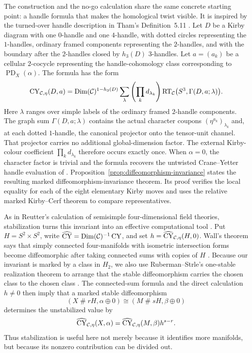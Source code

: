 The construction and the no-go calculation share the same concrete starting
point: a handle formula that makes the homological twist visible.  It is
inspired by the turned-over handle description in Tham's Definition~5.11
\cite{Tham2021}.  Let $D$ be a Kirby diagram with one $0$-handle and one
$4$-handle, with dotted circles representing the $1$-handles, ordinary
framed components representing the $2$-handles, and with the boundary after
the $2$-handles closed by $h_3(D)$ $3$-handles.  Let $a=(a_k)$ be a cellular
$2$-cocycle representing the handle-cohomology class corresponding to
$\operatorname{PD}_X(\alpha)$.  The formula has the form
\[
  \operatorname{CY}_{\mathcal{C},\eta}(D,a)
  = \operatorname{Dim}(\mathcal{C})^{1-h_3(D)}
    \sum_{\lambda}
      \left(\prod_k d_{\lambda_k}\right)
      \operatorname{RT}_{\mathcal{C}}
        \bigl(S^3,\Gamma(D,a;\lambda)\bigr).
\]
Here $\lambda$ ranges over simple labels of the ordinary framed
$2$-handle components.  The graph sum $\Gamma(D,a;\lambda)$ contains the
actual character coupons $(\eta^{a_k})_{\lambda_k}$ and, at each dotted
$1$-handle, the canonical projector onto the tensor-unit channel.  That
projector carries no additional global-dimension factor.  The external
Kirby-colour coefficient $\prod_kd_{\lambda_k}$ therefore occurs exactly
once.  When
$\alpha=0$, the character factor is trivial and the formula recovers the
untwisted Crane--Yetter handle evaluation of
\cite[Definition~5.11]{Tham2021}.  Proposition~\ref{prop:diffeomorphism-invariance}
states the resulting marked diffeomorphism-invariance theorem.  Its proof
verifies the local equality for each of the eight elementary Kirby moves and
uses the relative marked Kirby--Cerf theorem to compare representatives.

As in Reutter's calculation of semisimple four-dimensional field theories,
stabilization turns this invariant into an effective computational tool
\cite[Theorem~A and Corollary~3.9]{Reutter2023}.  Put
$H=S^2\times S^2$, write
$\widehat{\operatorname{CY}}=\operatorname{Dim}(\mathcal{C})^{-1}\operatorname{CY}$, and set
$h=\widehat{\operatorname{CY}}_{\mathcal{C},\eta}(H,0)$.  Wall's theorem says that simply connected
four-manifolds with isometric intersection forms become diffeomorphic after
taking connected sums with copies of $H$ \cite[Theorems~2--3]{Wall1964}.
Because our invariant is marked by a class in $H_2$, we also use
Ruberman--Strle's one-stable realization theorem to arrange that the stable
diffeomorphism carries the chosen class to the chosen class
\cite[Theorem~2.1]{RubermanStrle2022}.  The connected-sum formula and the
direct calculation $h\neq0$ then imply that a marked stable diffeomorphism
\[
  (X\mathbin{\#}rH,\alpha\oplus0)
  \cong (M\mathbin{\#}sH,\beta\oplus0)
\]
determines the unstabilized value by
\[
  \widehat{\operatorname{CY}}_{\mathcal{C},\eta}(X,\alpha)
  =\widehat{\operatorname{CY}}_{\mathcal{C},\eta}(M,\beta)h^{s-r}.
\]
Thus stabilization is useful here not merely because it identifies more
manifolds, but because its nonzero contribution can be divided out.

